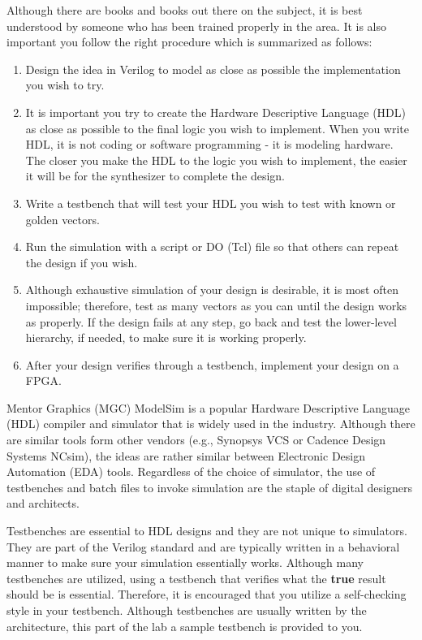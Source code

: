 \documentclass{article}
\begin{document}
Although there are books and books out there on the subject, it is
best understood by someone who has been trained properly in the area.
It is also important you follow the right procedure which is summarized as
follows:
\begin{enumerate}
  \item Design the idea in Verilog to model as close as possible the
    implementation you wish to try.
    \item It is important you try to create the Hardware Descriptive
      Language (HDL) as close as possible to the final logic you wish
      to implement.  When you write HDL, it is not coding or software
      programming - it is modeling hardware.  The closer you make the
      HDL to the logic you wish to implement, the easier it will be
      for the synthesizer to complete the design.
    \item Write a testbench that will test your HDL you wish to test
      with known or golden vectors.
    \item Run the simulation with a script or DO (Tcl) file so
      that others can repeat the design if you wish.
    \item Although exhaustive simulation of your design is desirable,
      it is most often impossible;  therefore, test as many vectors as
      you can until the design works as properly.  If the design fails
      at any step, go back and test the lower-level hierarchy, if
      needed, to make sure it is working properly.
      \item After your design verifies through a testbench, implement
        your design on a FPGA.
\end{enumerate}

Mentor Graphics (MGC) ModelSim is a popular Hardware Descriptive
Language (HDL) compiler and
simulator that is widely used in the industry.  Although there are
similar tools form other vendors (e.g., Synopsys VCS or Cadence Design
Systems NCsim), the ideas are rather similar between Electronic Design
Automation (EDA) tools.  Regardless of the choice of simulator, the
use of testbenches and batch files to invoke simulation are the staple
of digital designers and architects.  

Testbenches are essential to HDL designs and they are not unique to
simulators.  They are part of the Verilog standard and are typically
written in a behavioral manner to make sure your simulation
essentially works.  Although many testbenches are utilized, using a
testbench that verifies what the \textbf{true} result should be is
essential.  Therefore, it is encouraged that you utilize a
self-checking style in your testbench.  Although testbenches are
usually written by the architecture, this part of the lab a sample
testbench is provided to you.  
\end{document}

